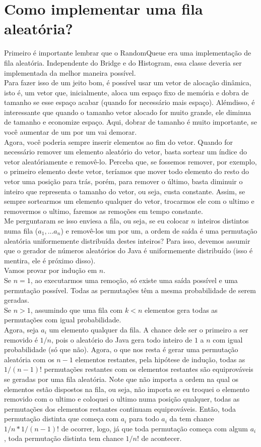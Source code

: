 \documentclass{article}
\begin{document}
\section{Como implementar uma fila aleatória?}
Primeiro é importante lembrar que o RandomQueue era uma implementação de fila aleatória. Independente do Bridge e do Histogram, essa classe deveria ser implementada da melhor maneira possível. \\
Para fazer isso de um jeito bom, é possível usar um vetor de alocação dinâmica, isto é, um vetor que, inicialmente, aloca um espaço fixo de memória e dobra de tamanho se esse espaço acabar (quando for necessário mais espaço). Alémdisso, é interessante que quando o tamanho vetor alocado for muito grande, ele diminua de tamanho e economize espaço. Aqui, dobrar de tamanho é muito importante, se você aumentar de um por um vai demorar. \\
Agora, você poderia sempre inserir elementos ao fim do vetor. Quando for necessário remover um elemento aleatório do vetor, basta sortear um índice do vetor aleatóriamente e removê-lo. Perceba que, se fossemos remover, por exemplo, o primeiro elemento deste vetor, teríamos que mover todo elemento do resto do vetor uma posição para trás, porém, para remover o último, basta diminuir o inteiro que representa o tamanho do vetor, ou seja, custa constante. Assim, se sempre sortearmos um elemento qualquer do vetor, trocarmos ele com o ultimo e removermos o ultimo, faremos as remoções em tempo constante. \\
Me perguntaram se isso enviesa a fila, ou seja, se eu colocar $n$ inteiros distintos numa fila ($a_1, \dots a_n$) e removê-los um por um, a ordem de saída é uma permutação aleatória uniformemente distribuída destes inteiros? Para isso, devemos assumir que o gerador de números aleatórios do Java é uniformemente distribuído (isso é mentira, ele é próximo disso). \\
Vamos provar por indução em $n$. \\
Se $n = 1$, ao executarmos uma remoção, só existe uma saída possível e uma permutação possível. Todas as permutações têm a mesma probabilidade de serem geradas. \\
Se $n > 1$, assumindo que uma fila com $k < n$ elementos gera todas as permutações com igual probabilidade. \\
Agora, seja $a_i$ um elemento qualquer da fila. A chance dele ser o primeiro a ser removido é $1/n$, pois o aleatório do Java gera todo inteiro de $1$ a $n$ com igual probabilidade (só que não). Agora, o que nos resta é gerar uma permutação aleatória com os $n-1$ elementos restantes, pela hipótese de indução, todas as $1/(n-1)!$ permutações restantes com os elementos restantes são equiprováveis se geradas por uma fila aleatória. Note que não importa a ordem na qual os elementos estão dispostos na fila, ou seja, não importa se eu troquei o elemento removido com o ultimo e coloquei o ultimo numa posição qualquer, todas as permutações dos elementos restantes continuam equiprováveis. Então, toda permutação distinta que começa com $a_i$ para todo $a_i$ da tem chance $1/n * 1/(n-1)!$ de ocorrer, logo, já que toda permutação começa com algum $a_i$, toda permutação distinta tem chance $1/n!$ de acontecer. \\
\end{document}
